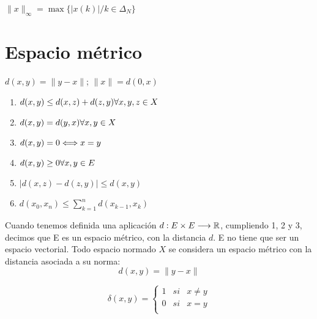     \begin{ejemplo}
        $\|x\|_\infty = \max\{|x(k)| / k \in \Delta_N\}$ 
    \end{ejemplo}
        
    

\section{Espacio métrico}
    \begin{definicion}[Distancia]
        $d(x,y) = \|y - x\|$; 
        $\|x\| = d(0,x )$
    \end{definicion}
        \begin{enumerate}
            \item $d(x,y) \leq d(x,z) + d(z,y) \\ \forall x,y,z \in X$
            \item $d(x,y) = d(y,x)\\ \forall x,y \in X$
            \item $d(x,y) =0 \Longleftrightarrow x=y$
            \item $d(x,y) \geq 0\\ \forall x,y \in E$
            \item $|d(x,z) - d(z,y)| \leq d(x,y)$
            \item $d(x_0,x_n) \leq \sum\limits_{k=1}^n d(x_{k-1},x_k)$
        \end{enumerate}

    
        Cuando tenemos definida una aplicación $d:E\times E \longrightarrow \mathbb R$, cumpliendo 1, 2 y 3, decimos que E es un espacio métrico, con la distancia $d$. E no tiene que ser un espacio vectorial.
        Todo espacio normado $X$ se considera un espacio métrico con la distancia asociada a su norma: 
        $$d(x,y) = \|y-x\|$$

    \begin{ejemplo}
        $$\delta (x,y) = \left\{ \begin{array}{lll}
            1 & si & x\neq y\\
            0 & si & x= y\\
        \end{array} \right.$$
    \end{ejemplo}
    


